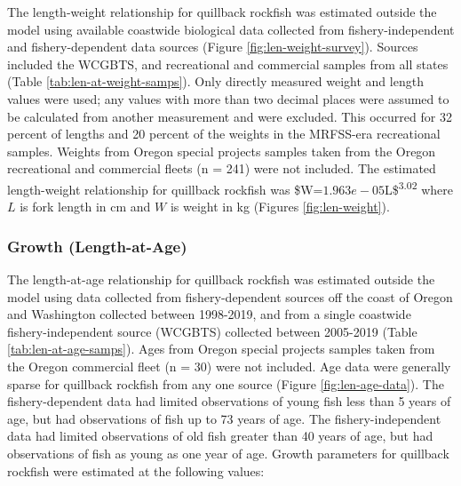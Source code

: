 \documentclass[11pt,
  english,
  a4paper,
]{article}
\begin{document}
The length-weight relationship for quillback rockfish was estimated outside the model using available coastwide biological data collected from fishery-independent and fishery-dependent data sources (Figure \ref{fig:len-weight-survey}). Sources included the WCGBTS, and recreational and commercial samples from all states (Table \ref{tab:len-at-weight-samps}). Only directly measured weight and length values were used; any values with more than two decimal places were assumed to be calculated from another measurement and were excluded. This occurred for 32 percent of lengths and 20 percent of the weights in the MRFSS-era recreational samples. Weights from Oregon special projects samples taken from the Oregon recreational and commercial fleets (n = 241) were not included. The estimated length-weight relationship for quillback rockfish was \$W={\(1.963e-05\)\leavevmode\tagmcend\tagstructend}L\$\textsuperscript{3.02} where {\(L\)\leavevmode\tagmcend\tagstructend} is fork length in cm and {\(W\)\leavevmode\tagmcend\tagstructend} is weight in kg (Figures \ref{fig:len-weight}).

\leavevmode\tagmcend\tagstructend\par


\hypertarget{growth-length-at-age}{%
\subsubsection{Growth (Length-at-Age)}\label{growth-length-at-age}}

\leavevmode\tagmcend\tagstructend


The length-at-age relationship for quillback rockfish was estimated outside the model using data collected from fishery-dependent sources off the coast of Oregon and Washington collected between 1998-2019, and from a single coastwide fishery-independent source (WCGBTS) collected between 2005-2019 (Table \ref{tab:len-at-age-samps}). Ages from Oregon special projects samples taken from the Oregon commercial fleet (n = 30) were not included. Age data were generally sparse for quillback rockfish from any one source (Figure \ref{fig:len-age-data}). The fishery-dependent data had limited observations of young fish less than 5 years of age, but had observations of fish up to 73 years of age. The fishery-independent data had limited observations of old fish greater than 40 years of age, but had observations of fish as young as one year of age. Growth parameters for quillback rockfish were estimated at the following values:
\end{document}
